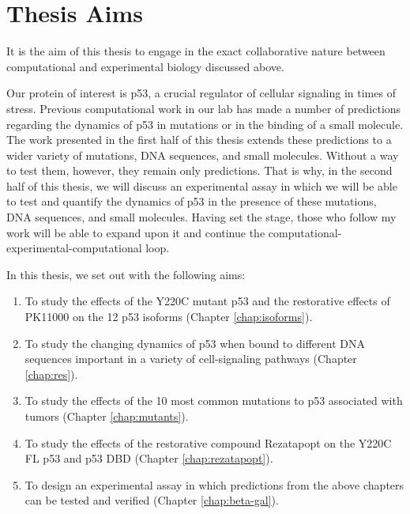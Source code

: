 \section{Thesis Aims}

It is the aim of this thesis to engage in the exact collaborative nature between computational and experimental biology discussed above.

Our protein of interest is p53, a crucial regulator of cellular signaling in times of stress. Previous computational work in our lab has made a number of predictions regarding the dynamics of p53 in mutations or in the binding of a small molecule. The work presented in the first half of this thesis extends these predictions to a wider variety of mutations, DNA sequences, and small molecules. Without a way to test them, however, they remain only predictions. That is why, in the second half of this thesis, we will discuss an experimental assay in which we will be able to test and quantify the dynamics of p53 in the presence of these mutations, DNA sequences, and small molecules. Having set the stage, those who follow my work will be able to expand upon it and continue the computational-experimental-computational loop.

In this thesis, we set out with the following aims:

\begin{enumerate}
\item To study the effects of the Y220C mutant p53 and the restorative effects of PK11000 on the \num{12} p53 isoforms (Chapter \ref{chap:isoforms}).
\item To study the changing dynamics of p53 when bound to different DNA sequences important in a variety of cell-signaling pathways (Chapter \ref{chap:res}).
\item To study the effects of the \num{10} most common mutations to p53 associated with tumors (Chapter \ref{chap:mutants}).
\item To study the effects of the restorative compound Rezatapopt on the Y220C FL p53 and p53 DBD (Chapter \ref{chap:rezatapopt}).
\item To design an experimental assay in which predictions from the above chapters can be tested and verified (Chapter \ref{chap:beta-gal}).
\end{enumerate}
